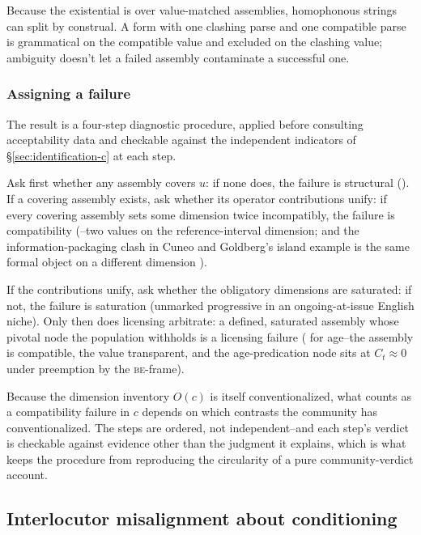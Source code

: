 Because the existential is over value-matched assemblies, homophonous strings can split by construal. A form with one clashing parse and one compatible parse is grammatical on the compatible value and excluded on the clashing value; ambiguity doesn't let a failed assembly contaminate a successful one.

\subsubsection{Assigning a failure}
\label{sec:assigning-failure}
\label{sec:failure-assignment}

The result is a four-step diagnostic procedure, applied before consulting acceptability data and checkable against the independent indicators of \S\ref{sec:identification-c} at each step.

Ask first whether any assembly covers $u$: if none does, the failure is structural (). If a covering assembly exists, ask whether its operator contributions unify: if every covering assembly sets some dimension twice incompatibly, the failure is compatibility (--two values on the reference-interval dimension; and the information-packaging clash in Cuneo and Goldberg's island example is the same formal object on a different dimension \autocite{CuneoGoldberg2022Islands}).

If the contributions unify, ask whether the obligatory dimensions are saturated: if not, the failure is saturation (unmarked progressive in an ongoing-at-issue English niche). Only then does licensing arbitrate: a defined, saturated assembly whose pivotal node the population withholds is a licensing failure ( for age--the assembly is compatible, the value transparent, and the age-predication node sits at $C_t\approx0$ under preemption by the \textsc{be}-frame).

Because the dimension inventory $O(c)$ is itself conventionalized, what counts as a compatibility failure in $c$ depends on which contrasts the community has conventionalized. The steps are ordered, not independent--and each step's verdict is checkable against evidence other than the judgment it explains, which is what keeps the procedure from reproducing the circularity of a pure community-verdict account.

\subsection{Interlocutor misalignment about conditioning}
\label{sec:misalignment-conditioning}

